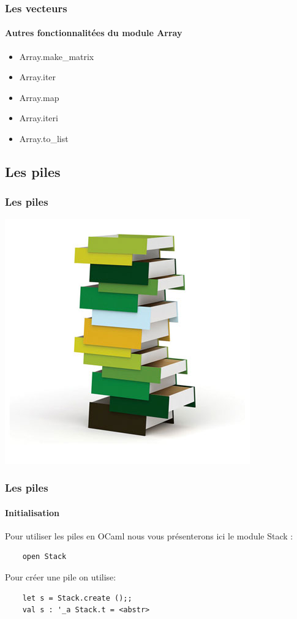 \begin{frame}[fragile]
	\frametitle{Les vecteurs}
	\framesubtitle{Autres fonctionnalitées du module Array}
	\begin{itemize}
	\item Array.make\_matrix
	
	\item Array.iter

	\item Array.map

	\item Array.iteri

	\item Array.to\_list

	\end{itemize}
\end{frame}

\subsection{Les piles}
\begin{frame}
	\frametitle{Les piles}
	\includegraphics[scale=0.4]{pics/stack.jpg}
\end{frame}

\begin{frame}[fragile]
	\frametitle{Les piles}
	\framesubtitle{Initialisation}
	Pour utiliser les piles en OCaml nous vous présenterons ici le module Stack :
	\begin{lstlisting}
	open Stack
	\end{lstlisting}
	Pour créer une pile on utilise:
	\begin{lstlisting}
	let s = Stack.create ();;
	val s : '_a Stack.t = <abstr>
	\end{lstlisting}
\end{frame}

